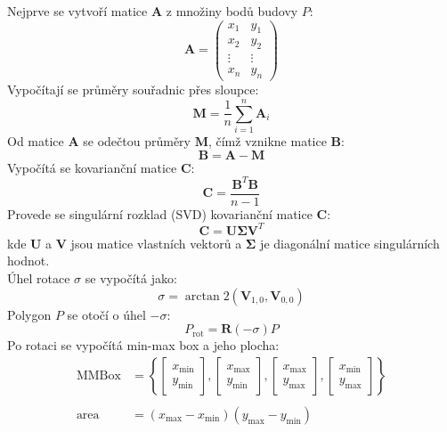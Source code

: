 \hspace{-1.15cm}
Nejprve se vytvoří matice \( \mathbf{A} \) z množiny bodů budovy \( P \):
\begin{equation}
    \mathbf{A} = \begin{pmatrix}
    x_1 & y_1 \\
    x_2 & y_2 \\
    \vdots & \vdots \\
    x_n & y_n
    \end{pmatrix}
\end{equation}
Vypočítají se průměry souřadnic přes sloupce:
\begin{equation}
    \mathbf{M} = \frac{1}{n} \sum_{i=1}^{n} \mathbf{A}_i
\end{equation}
Od matice \( \mathbf{A} \) se odečtou průměry \( \mathbf{M} \), čímž vznikne matice \( \mathbf{B} \):
\begin{equation}
    \mathbf{B} = \mathbf{A} - \mathbf{M}
\end{equation}
Vypočítá se kovarianční matice \( \mathbf{C} \):
\begin{equation}
    \mathbf{C} = \frac{\mathbf{B}^T \mathbf{B}}{n - 1}
\end{equation}
Provede se singulární rozklad (SVD) kovarianční matice \( \mathbf{C} \):
\begin{equation}
    \mathbf{C} = \mathbf{U} \mathbf{\Sigma} \mathbf{V}^T
\end{equation}
kde \( \mathbf{U} \) a \( \mathbf{V} \) jsou matice vlastních vektorů a \( \mathbf{\Sigma} \) je diagonální matice singulárních hodnot. \\
\hspace{-1.15cm}
Úhel rotace \( \sigma \) se vypočítá jako:
\begin{equation}
    \sigma = \arctan2(\mathbf{V}_{1,0}, \mathbf{V}_{0,0})
\end{equation}
Polygon \( P \) se otočí o úhel \( -\sigma \):
\begin{equation}
    P_{\text{rot}} = \mathbf{R}(-\sigma) P
\end{equation}
Po rotaci se vypočítá min-max box a jeho plocha:
\begin{align}
    \text{MMBox} &= \left\{
    \begin{bmatrix} x_{\min} \\ y_{\min} \end{bmatrix},
    \begin{bmatrix} x_{\max} \\ y_{\min} \end{bmatrix},
    \begin{bmatrix} x_{\max} \\ y_{\max} \end{bmatrix},
    \begin{bmatrix} x_{\min} \\ y_{\max} \end{bmatrix}
    \right\}\\
    \nonumber\\
    \text{area} &= (x_{\max} - x_{\min})(y_{\max} - y_{\min})
\end{align}
